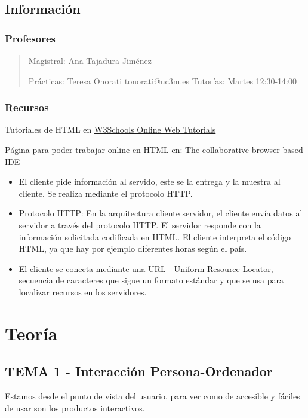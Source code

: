 \documentclass[12pt, twoside, openright]{report} %
\begin{document}

\chapter{Información}
\section{Profesores}
\begin{quote}
	Magistral: Ana Tajadura Jiménez

	Prácticas: Teresa Onorati tonorati@uc3m.es Tutorías: Martes 12:30-14:00
\end{quote}

\section{Recursos}

Tutoriales de HTML en \href{https://www.w3schools.com/}{W3Schools Online Web Tutorials}

Página para poder trabajar online en HTML en: \href{https://repl.it/}{The collaborative browser based IDE}

\begin{itemize}
	\item El cliente pide información al servido, este se la entrega y la
	      muestra al cliente. Se realiza mediante el protocolo HTTP.
	\item Protocolo HTTP: En la arquitectura cliente servidor, el cliente envía
	      datos al servidor a través del protocolo HTTP. El servidor responde
	      con la información solicitada codificada en HTML. El cliente
	      interpreta el código HTML, ya que hay por ejemplo diferentes horas
	      según el país.
	\item El cliente se conecta mediante una URL - Uniform Resource Locator,
	      secuencia de caracteres que sigue un formato estándar y que se usa
	      para localizar recursos en los servidores.
\end{itemize}

\part{Teoría}


\chapter{TEMA 1 - Interacción Persona-Ordenador}
Estamos desde el punto de vista del usuario, para ver como de
accesible y fáciles de usar son los productos interactivos.
\end{document}

